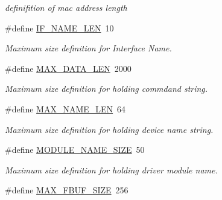 \begin{DoxyCompactItemize}
\begin{DoxyCompactList}\small\item\em definifition of mac address length \end{DoxyCompactList}\item 
\hypertarget{group__FAPI__SYSTEM_gaeaf382b996a41951b00a84866b46840f}{\#define \hyperlink{group__FAPI__SYSTEM_gaeaf382b996a41951b00a84866b46840f}{I\-F\-\_\-\-N\-A\-M\-E\-\_\-\-L\-E\-N}~10}\label{group__FAPI__SYSTEM_gaeaf382b996a41951b00a84866b46840f}

\begin{DoxyCompactList}\small\item\em Maximum size definition for Interface Name. \end{DoxyCompactList}\item 
\hypertarget{group__FAPI__SYSTEM_ga0c00a96baa89438d6b732b92a1ba11b9}{\#define \hyperlink{group__FAPI__SYSTEM_ga0c00a96baa89438d6b732b92a1ba11b9}{M\-A\-X\-\_\-\-D\-A\-T\-A\-\_\-\-L\-E\-N}~2000}\label{group__FAPI__SYSTEM_ga0c00a96baa89438d6b732b92a1ba11b9}

\begin{DoxyCompactList}\small\item\em Maximum size definition for holding commdand string. \end{DoxyCompactList}\item 
\hypertarget{group__FAPI__SYSTEM_gafd709f201d7643c3909621f620ea648a}{\#define \hyperlink{group__FAPI__SYSTEM_gafd709f201d7643c3909621f620ea648a}{M\-A\-X\-\_\-\-N\-A\-M\-E\-\_\-\-L\-E\-N}~64}\label{group__FAPI__SYSTEM_gafd709f201d7643c3909621f620ea648a}

\begin{DoxyCompactList}\small\item\em Maximum size definition for holding device name string. \end{DoxyCompactList}\item 
\hypertarget{group__FAPI__SYSTEM_ga6edf41ef66c2e69ad25270236c1375b6}{\#define \hyperlink{group__FAPI__SYSTEM_ga6edf41ef66c2e69ad25270236c1375b6}{M\-O\-D\-U\-L\-E\-\_\-\-N\-A\-M\-E\-\_\-\-S\-I\-Z\-E}~50}\label{group__FAPI__SYSTEM_ga6edf41ef66c2e69ad25270236c1375b6}

\begin{DoxyCompactList}\small\item\em Maximum size definition for holding driver module name. \end{DoxyCompactList}\item 
\hypertarget{group__FAPI__SYSTEM_ga2862f715c49f44adc3f2ab6892cb9c21}{\#define \hyperlink{group__FAPI__SYSTEM_ga2862f715c49f44adc3f2ab6892cb9c21}{M\-A\-X\-\_\-\-F\-B\-U\-F\-\_\-\-S\-I\-Z\-E}~256}\label{group__FAPI__SYSTEM_ga2862f715c49f44adc3f2ab6892cb9c21}


\end{DoxyCompactItemize}
